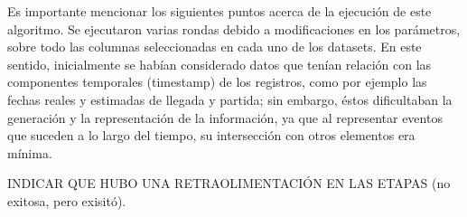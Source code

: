 \documentclass[12pt]{article}
\numberwithin{equation}{section}
\numberwithin{table}{section}
\numberwithin{figure}{section}
\begin{document}
Es importante mencionar los siguientes puntos acerca de la ejecución de este algoritmo.
Se ejecutaron varias rondas debido a modificaciones en los parámetros, sobre todo las columnas seleccionadas en cada uno de los datasets.
En este sentido, inicialmente se habían considerado datos que tenían relación con las componentes temporales (timestamp) de los registros, como por ejemplo las fechas reales y estimadas de llegada y partida; sin embargo, éstos dificultaban la generación y la representación de la información, ya que al representar eventos que suceden a lo largo del tiempo, su intersección con otros elementos era mínima.

INDICAR QUE HUBO UNA RETRAOLIMENTACIÓN EN LAS ETAPAS (no exitosa, pero exisitó).
\end{document}
